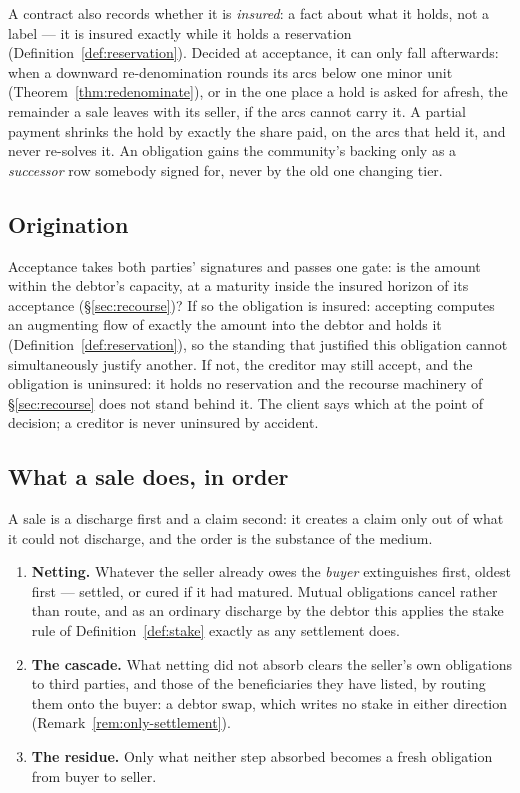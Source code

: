 A contract also records whether it is \emph{insured}: a fact about what it holds, not a
label --- it is insured exactly while it holds a reservation
(Definition~\ref{def:reservation}). Decided at acceptance, it can only fall afterwards:
when a downward re-denomination rounds its arcs below one minor unit
(Theorem~\ref{thm:redenominate}), or in the one place a hold is asked for afresh, the
remainder a sale leaves with its seller, if the arcs cannot carry it. A partial payment
shrinks the hold by exactly the share paid, on the arcs that held it, and never re-solves
it. An obligation gains the community's backing only as a \emph{successor} row somebody
signed for, never by the old one changing tier.

\subsection{Origination}

Acceptance takes both parties' signatures and passes one gate: is the amount within the
debtor's capacity, at a maturity inside the insured horizon of its acceptance
(\S\ref{sec:recourse})? If so the obligation is insured: accepting computes an augmenting
flow of exactly the amount into the debtor and holds it (Definition~\ref{def:reservation}),
so the standing that justified this obligation cannot simultaneously justify another. If
not, the creditor may still accept, and the obligation is uninsured: it holds no
reservation and the recourse machinery of \S\ref{sec:recourse} does not stand behind it.
The client says which at the point of decision; a creditor is never uninsured by
accident.

\subsection{What a sale does, in order}
\label{sec:sale}

A sale is a discharge first and a claim second: it creates a claim only out of what it
could not discharge, and the order is the substance of the medium.

\begin{enumerate}[leftmargin=1.6em]
  \item \textbf{Netting.} Whatever the seller already owes the \emph{buyer} extinguishes
        first, oldest first --- settled, or cured if it had matured. Mutual obligations
        cancel rather than route, and as an ordinary discharge by the debtor this applies
        the stake rule of Definition~\ref{def:stake} exactly as any settlement does.
  \item \textbf{The cascade.} What netting did not absorb clears the seller's own
        obligations to third parties, and those of the beneficiaries they have listed, by
        routing them onto the buyer: a debtor swap, which writes no stake in either
        direction (Remark~\ref{rem:only-settlement}).
  \item \textbf{The residue.} Only what neither step absorbed becomes a fresh obligation
        from buyer to seller.
\end{enumerate}

